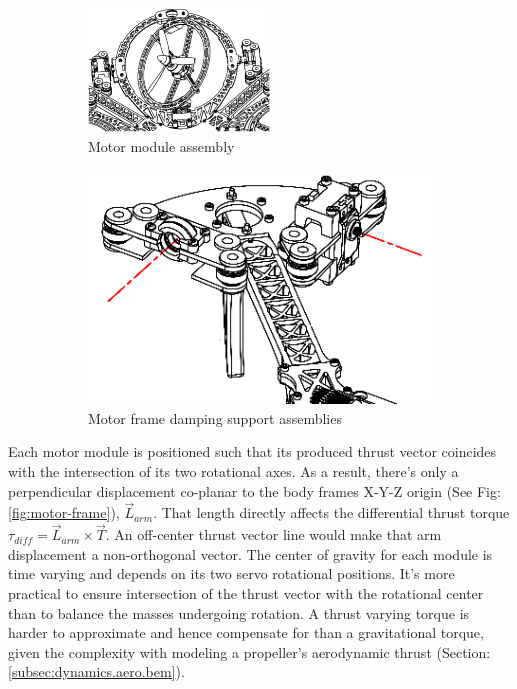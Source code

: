 \begin{figure}[hbtp]
\begin{subfigure}{.5\textwidth}
\centering
\includegraphics[width=\textwidth]{figs/motor-assembly}
\caption{Motor module assembly}
\label{fig:motor-assembly}
\end{subfigure}
\begin{subfigure}{.5\textwidth}
\centering
\includegraphics[width=\textwidth]{figs/motor-support}
\caption{Motor frame damping support assemblies}
\label{fig:motor_support}
\end{subfigure}
\caption{}
\end{figure}
Each motor module is positioned such that its produced thrust vector coincides with the intersection of its two rotational axes. As a result, there's only a perpendicular displacement co-planar to the body frames X-Y-Z origin (See Fig:\ref{fig:motor-frame}), $\vec{L}_{arm}$. That length directly affects the differential thrust torque $\tau_{diff}=\vec{L}_{arm}\times\vec{T}$. An off-center thrust vector line would make that arm displacement a non-orthogonal vector. The center of gravity for each module is time varying and depends on its two servo rotational positions. It's more practical to ensure intersection of the thrust vector with the rotational center than to balance the masses undergoing rotation. A thrust varying torque is harder to approximate and hence compensate for than a gravitational torque, given the complexity with modeling a propeller's aerodynamic thrust (Section:\ref{subsec:dynamics.aero.bem}).
